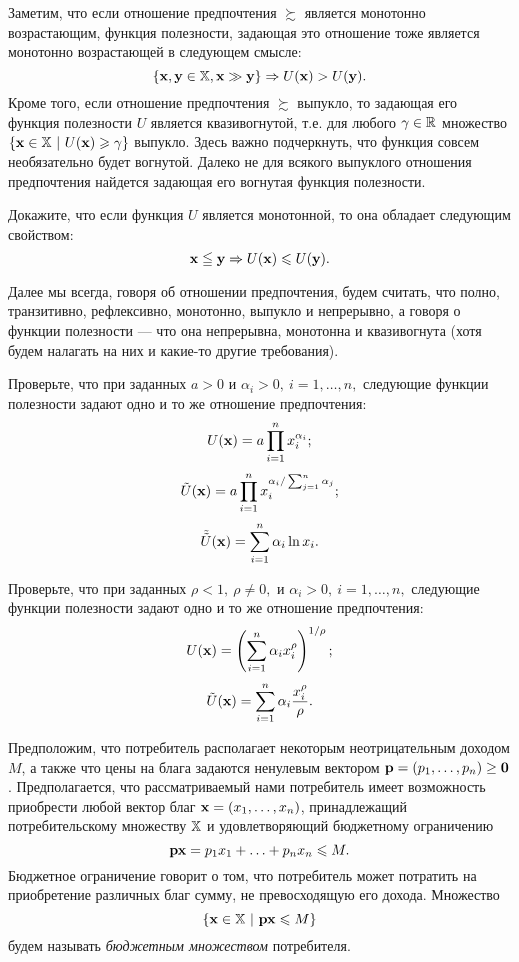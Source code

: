     Заметим, что если отношение предпочтения $\succsim$ является монотонно
    возрастающим, функция полезности, задающая это отношение тоже
    является монотонно возрастающей в следующем смысле:
    \[\{\mathbf{x}, \mathbf{y}\in\mathbb{X}, \mathbf{x}\gg\mathbf{y}\}
     \Rightarrow U(\mathbf{x})>U(\mathbf{y}). \]
     Кроме того, если отношение предпочтения $\succsim$ выпукло, то
     задающая его функция полезности $U$ является квазивогнутой,
     т.е. для любого $\gamma\in\mathbb{R}$ множество $\{\mathbf{x}\in\mathbb{X} \ | \
     U(\mathbf{x})\geqslant\gamma\}$ выпукло. Здесь важно подчеркнуть, что
     функция совсем необязательно будет вогнутой. Далеко не для
     всякого выпуклого отношения предпочтения найдется задающая его вогнутая
     функция полезности.

\begin{exer}
\label{monot-ut}
    Докажите, что если функция $U$ является монотонной, то
    она обладает следующим свойством:
    \[\mathbf{x}\leqq\mathbf{y}\Rightarrow U(\mathbf{x})\leqslant U(\mathbf{y}).\]
\end{exer}

     Далее мы всегда, говоря об отношении предпочтения, будем
     считать, что полно, транзитивно, рефлексивно, монотонно,
     выпукло и непрерывно, а говоря о функции полезности --- что она
     непрерывна, монотонна и квазивогнута (хотя будем налагать на них и какие-то другие
     требования).


\begin{exer}
\label{fun-polCD}
    Проверьте, что при заданных $a>0$ и $\alpha_{i}>0, \ i=1,\ldots,n,$
    следующие функции полезности задают одно и то же отношение предпочтения:
    \[U(\mathbf{x})=a\prod_{i=1}^{n}x_{i}^{\alpha_{i}};\]
    \[\tilde{U}(\mathbf{x})=a\prod_{i=1}^{n}x_{i}^{\alpha_{i}/\sum_{j=1}^{n}\alpha_{j}};\]
    \[\tilde{\tilde{U}}(\mathbf{x})=\sum_{i=1}^{n}\alpha_{i}\ln x_{i}.\]
\end{exer}

\begin{exer}
\label{fun-polCES}
    Проверьте, что при заданных $\rho<1, \ \rho\neq0,$ и
    $\alpha_{i}>0, \ i=1,\ldots,n,$ следующие функции полезности задают одно и то же
    отношение предпочтения:
     \[U(\mathbf{x})=\left(\sum_{i=1}^{n}\alpha_{i}x_{i}^{\rho}\right)^{1/\rho};\]
    \[\tilde{U}(\mathbf{x})=\sum_{i=1}^{n}\alpha_{i}\frac{x_{i}^{\rho}}{\rho}.\]
\end{exer}



    Предположим, что потребитель располагает некоторым неотрицательным доходом $M$,
     а также что цены на блага задаются ненулевым вектором
    $\mathbf{p}=(p_{1},\ldots,p_{n})\geq\mathbf{0}$. Предполагается, что рассматриваемый нами
    потребитель имеет возможность приобрести любой вектор благ
    $\mathbf{x}=(x_{1},\ldots,x_{n})$, принадлежащий
    потребительскому множеству $\mathbb{X}$ и удовлетворяющий бюджетному
    ограничению
    \[\mathbf{p}\mathbf{x}=p_{1}x_{1}+\ldots+p_{n}x_{n}\leqslant M.\]
    Бюджетное ограничение
    говорит о том, что потребитель может потратить на приобретение
    различных благ сумму, не превосходящую его дохода. Множество
    \[\{\vc{x}\in\st{X} \ | \ \vc{p}\vc{x}\leqslant M\}\]
    будем называть \emph{бюджетным множеством} потребителя.


